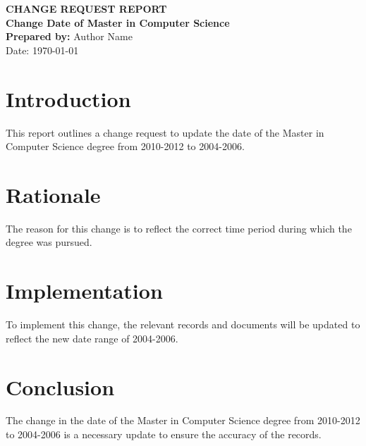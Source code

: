 \documentclass[12pt,a4paper]{report}
\begin{document}
\begin{titlepage}
    \centering
    {\Large\textbf{CHANGE REQUEST REPORT}}\\[2cm]
    {\Huge\textbf{Change Date of Master in Computer Science}}\\[3cm]
    \textbf{Prepared by:} Author Name\\[0.5cm]
    {\large Date: \today}
\end{titlepage}

\tableofcontents
\newpage

\chapter{Introduction}
This report outlines a change request to update the date of the Master in Computer Science degree from 2010-2012 to 2004-2006.

\chapter{Rationale}
The reason for this change is to reflect the correct time period during which the degree was pursued.

\chapter{Implementation}
To implement this change, the relevant records and documents will be updated to reflect the new date range of 2004-2006.

\chapter{Conclusion}
The change in the date of the Master in Computer Science degree from 2010-2012 to 2004-2006 is a necessary update to ensure the accuracy of the records.
\end{document}
